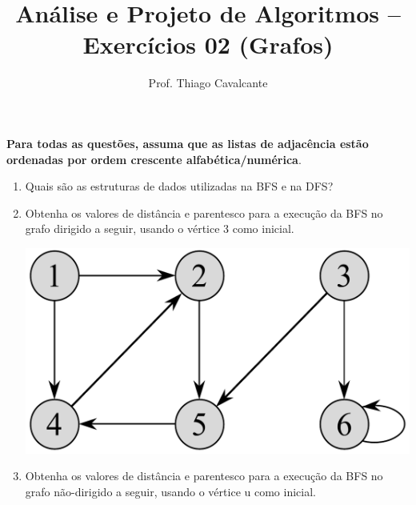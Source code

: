 \documentclass[a4paper,11pt]{article}
\title{Análise e Projeto de Algoritmos -- Exercícios 02 (Grafos)}
\author{Prof. Thiago Cavalcante}
\date{}
\begin{document}
\maketitle

\sloppy
\raggedright

\setlength{\leftmargini}{0pt}

\textbf{Para todas as questões, assuma que as listas de adjacência estão ordenadas por ordem crescente alfabética/numérica}.

\begin{enumerate}
  \item Quais são as estruturas de dados utilizadas na BFS e na DFS? %

  \item Obtenha os valores de distância e parentesco para a execução da BFS no grafo dirigido a seguir, usando o vértice 3 como inicial.

  \begin{center}
    \includegraphics[width=.8\textwidth]{graph2.png}
  \end{center}

  \item Obtenha os valores de distância e parentesco para a execução da BFS no grafo não-dirigido a seguir, usando o vértice u como inicial.


\end{enumerate}
\end{document}
